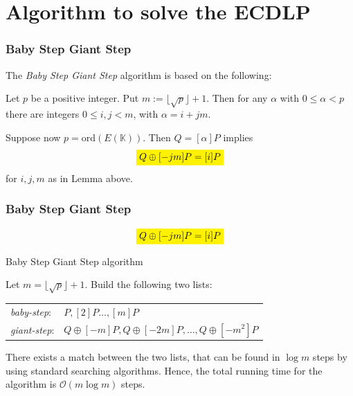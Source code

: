 \documentclass[
	11pt, %
]{beamer}
\newcommand{\K}{\mathbb{K}}
\newcommand{\highlight}[2][yellow]{\mathchoice%
	{\colorbox{#1}{$\displaystyle#2$}}%
	{\colorbox{#1}{$\textstyle#2$}}%
	{\colorbox{#1}{$\scriptstyle#2$}}%
	{\colorbox{#1}{$\scriptscriptstyle#2$}}}%
\theoremstyle{definition}
\theoremstyle{remark}
\begin{document}

\section{Algorithm to solve the ECDLP}

\begin{frame}
	\frametitle{Baby Step Giant Step}
	The \emph{Baby Step Giant Step} algorithm is based on the following: 
	\begin{lemma}\label{diveuc}
		Let $p$ be a positive integer. Put $m:=\lfloor \sqrt{p}\rfloor+1$. Then for any $\alpha$ with $0\leq \alpha<p$ there are integers $0\leq i,j< m$, with $\alpha=i+jm$.
	\end{lemma}	
Suppose now $p=\text{ord}(E(\K))$. Then $Q=[\alpha]P$ implies $$\highlight[yellow]{Q\oplus[-jm]P=[i]P}$$ for $i,j,m$ as in Lemma above.
\end{frame}


\begin{frame}
	\frametitle{Baby Step Giant Step}
	$$\highlight[yellow]{Q\oplus[-jm]P=[i]P}$$
	\begin{block}{Baby Step Giant Step algorithm}
		
	Let $m=\lfloor\sqrt{p}\rfloor +1$. Build the following two lists:
	\begin{center}
		\begin{tabular}{ll} 
			\emph{baby-step}: & $P,[2]P\ldots,[m]P$ \\ 
			\emph{giant-step}: & $Q\oplus[-m]P,Q\oplus[-2m]P,\ldots,Q\oplus[-m^2]P$\\ 
		\end{tabular}
	\end{center}
There exists a match between the two lists, that can be found in $\log m$ steps by using standard searching algorithms. Hence, the total running time for the algorithm is $\mathcal{O}( m\log m)$ steps.
	\end{block}
\end{frame}

\end{document}
